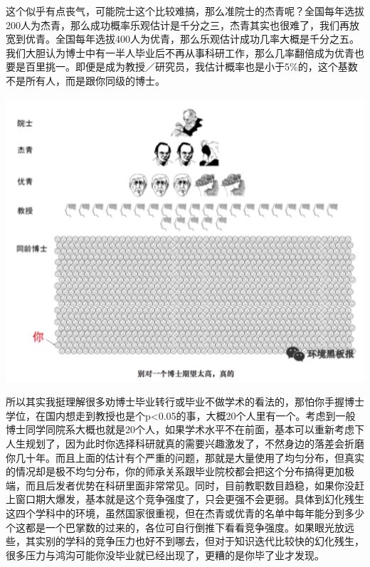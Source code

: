 \documentclass[]{book}
\begin{document}
这个似乎有点丧气，可能院士这个比较难搞，那么准院士的杰青呢？全国每年选拔200人为杰青，那么成功概率乐观估计是千分之三，杰青其实也很难了，我们再放宽到优青。全国每年选拔400人为优青，那么乐观估计成功几率大概是千分之五。我们大胆认为博士中有一半人毕业后不再从事科研工作，那么几率翻倍成为优青也要是百里挑一。即便是成为教授／研究员，我估计概率也是小于5\%的，这个基数不是所有人，而是跟你同级的博士。

\includegraphics[width=6.67in]{images/hhcs3}

所以其实我挺理解很多劝博士毕业转行或毕业不做学术的看法的，那怕你手握博士学位，在国内想走到教授也是个p\textless{}0.05的事，大概20个人里有一个。考虑到一般博士同学同院系大概也就是20个人，如果学术水平不在前面，基本可以重新考虑下人生规划了，因为此时你选择科研就真的需要兴趣激发了，不然身边的落差会折磨你几十年。而且上面的估计有个严重的问题，那就是大量使用了均匀分布，但真实的情况却是极不均匀分布，你的师承关系跟毕业院校都会把这个分布搞得更加极端，而且后发者优势在科研里面非常常见。同时，目前教职数目趋稳，如果你没赶上窗口期大爆发，基本就是这个竞争强度了，只会更强不会更弱。具体到幻化残生这四个学科中的环境，虽然国家很重视，但在杰青或优青的名单中每年能分到多少个这都是一个巴掌数的过来的，各位可自行倒推下看看竞争强度。如果眼光放远些，其实别的学科的竞争压力也好不到哪去，但对于知识迭代比较快的幻化残生，很多压力与鸿沟可能你没毕业就已经出现了，更糟的是你毕了业才发现。
\end{document}
